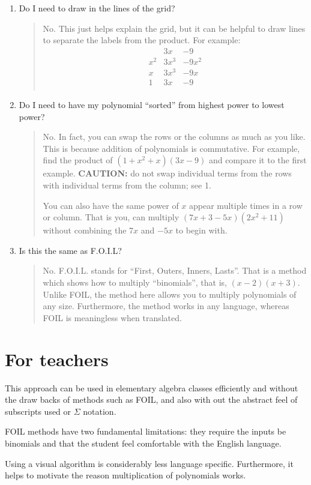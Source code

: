 \documentclass[12pt]{article}
\begin{document}
\begin{enumerate}
\item Do I need to draw in the lines of the grid?
\begin{quote}
No.  This just helps explain the grid, but it can be helpful to draw lines to separate the labels from the product.
For example:
\begin{equation}
\begin{array}{c|cc}
 & 3x & -9 \\
\hline
x^2 & 3x^{3} & -9x^2\\
x & 3x^3 & -9x\\
1 & 3x & -9 \\
\end{array}
\end{equation}
\end{quote}

\item Do I need to have my polynomial ``sorted'' from highest power to lowest power?
\begin{quote}
No.  In fact, you can swap the rows or the columns as much as you like.  This is because
addition of polynomials is commutative.  For example, find the product of
$(1+x^2+x)(3x-9)$ and compare it to the first example. \textbf{CAUTION:} do not swap
individual terms from the rows with individual terms from the column; see 1.

You can also have
the same power of $x$ appear multiple times in a row or column.  That is you, can 
multiply $(7x+3-5x)(2x^2+11)$ without combining the $7x$ and $-5x$ to begin with. 
\end{quote}

\item Is this the same as F.O.I.L?
\begin{quote}
No.  F.O.I.L. stands for ``First, Outers, Inners, Lasts''.  That is a method which shows
how to multiply ``binomials'', that is, $(x-2)(x+3)$.  Unlike FOIL, the method here
allows you to multiply polynomials of any size.  Furthermore, the method works in any
language, whereas FOIL is meaningless when translated.
\end{quote}
\end{enumerate}

\section{For teachers}

This approach can be used in elementary algebra classes efficiently and without
the draw backs of methods such as FOIL, and also with out the abstract feel of
subscripts used or $\Sigma$ notation.

FOIL methods have two fundamental limitations: they require the inputs be binomials
and that the student feel comfortable with the English language.

Using a visual algorithm is considerably less language specific.  Furthermore,
it helps to motivate the reason multiplication of polynomials works.


\end{document}
